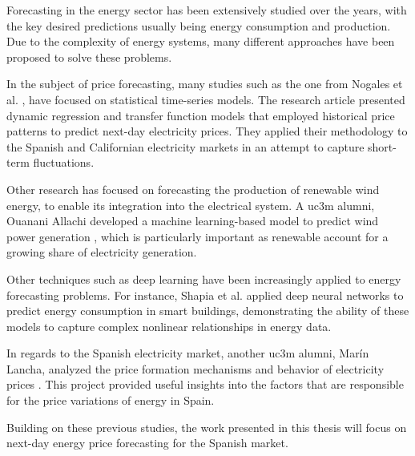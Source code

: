 \documentclass[12pt]{report} %
\begin{document}





Forecasting in the energy sector has been extensively studied over the years, with the key desired predictions usually being energy consumption and production. Due to the complexity of energy systems, many different approaches have been proposed to solve these problems.

In the subject of price forecasting, many studies such as the one from Nogales et al. \cite{time-series-energy}, have focused on statistical time-series models. The research article presented dynamic regression and transfer function models that employed historical price patterns to predict next-day electricity prices. They applied their methodology to the Spanish and Californian electricity markets in an attempt to capture short-term fluctuations.

Other research has focused on forecasting the production of renewable wind energy, to enable its integration into the electrical system. A uc3m alumni, Ouanani Allachi developed a machine learning-based model to predict wind power generation \cite{ml-tfg-uc3m-wind}, which is particularly important as renewable account for a growing share of electricity generation.

Other techniques such as deep learning have been increasingly applied to energy forecasting problems. For instance, Shapia et al. \cite{malasyia-neural-nets} applied deep neural networks to predict energy consumption in smart buildings, demonstrating the ability of these models to capture complex nonlinear relationships in energy data.

In regards to the Spanish electricity market, another uc3m alumni, Marín Lancha, analyzed the price formation mechanisms and behavior of electricity prices \cite{electricity-price-uc3m-tfg}. This project provided useful insights into the factors that are responsible for the price variations of energy in Spain.

Building on these previous studies, the work presented in this thesis will focus on next-day energy price forecasting for the Spanish market.
\end{document}
